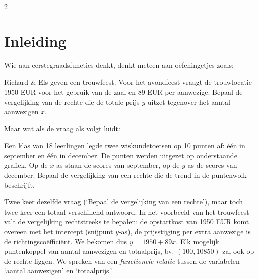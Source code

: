 
\startcontents[inhoudloep]	%

\begin{multicols}{2}
	
	\inhoudstafelloep			%
	\vspace{-5mm}
	\section{Inleiding}
Wie aan eerstegraadsfuncties denkt, denkt meteen aan oefeningetjes zoals: 	
\begin{citaat}
     Richard \& Els geven een trouwfeest. Voor het avondfeest vraagt de trouwlocatie 1950 EUR voor het gebruik van de zaal en 89 EUR per aanwezige. Bepaal de vergelijking van de rechte die de totale prijs $y$ uitzet tegenover het aantal aanwezigen $x$.
         \end{citaat}	

Maar wat als de vraag als volgt luidt:

\begin{citaat}
     Een klas van 18 leerlingen legde twee wiskundetoetsen op 10 punten af: één in september en één in december. De punten werden uitgezet op onderstaande grafiek. Op de $x$-as staan de scores van september, op de $y$-as de scores van december. Bepaal de vergelijking van een rechte die de trend in de puntenwolk beschrijft.
    \end{citaat}
Twee keer dezelfde vraag (`Bepaal de vergelijking van een rechte'), maar toch twee keer een totaal verschillend antwoord. In het voorbeeld van het trouwfeest valt de vergelijking rechtstreeks te bepalen: de opstartkost van 1950 EUR  komt overeen met het intercept (snijpunt $y$-as), de prijsstijging per extra aanwezige is de richtingscoëfficiënt. We bekomen dus $y = 1950 + 89x$. Elk mogelijk puntenkoppel van aantal aanwezigen en totaalprijs, bv. $(100,10850)$ zal ook op de rechte liggen. We spreken van een \textit{functionele relatie} tussen de variabelen `aantal aanwezigen' en `totaalprijs.' 


\end{multicols}
